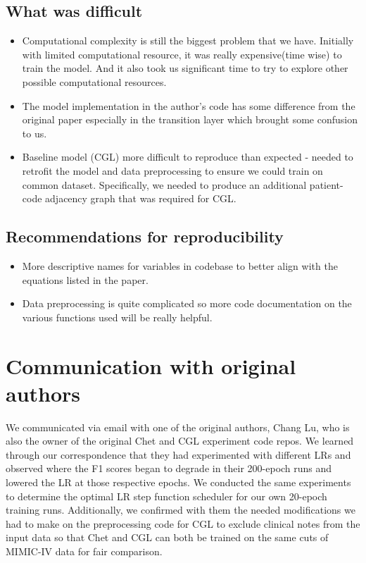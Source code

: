 \documentclass[11pt,a4paper,fleqn]{article}
\begin{document}
\subsection{What was difficult}
\begin{itemize}
    \item Computational complexity is still the biggest problem that we have. Initially with limited computational resource, it was really expensive(time wise) to train the model. And it also took us significant time to try to explore other possible computational resources.
    \item The model implementation in the author's code has some difference from the original paper especially in the transition layer which brought some confusion to us.
    \item Baseline model (CGL) more difficult to reproduce than expected - needed to retrofit the model and data preprocessing to ensure we could train on common dataset. Specifically, we needed to produce an additional patient-code adjacency graph that was required for CGL.
\end{itemize}

\subsection{Recommendations for reproducibility}
\begin{itemize}
    \item More descriptive names for variables in codebase to better align with the equations listed in the paper.
    \item Data preprocessing is quite complicated so more code documentation on the various functions used will be really helpful.
\end{itemize}

\section{Communication with original authors}
We communicated via email with one of the original authors, Chang Lu, who is
also the owner of the original Chet and CGL experiment code repos. We learned
through our correspondence that they had experimented with different LRs and
observed where the F1 scores began to degrade in their 200-epoch runs and
lowered the LR at those respective epochs. We conducted the same experiments to
determine the optimal LR step function scheduler for our own 20-epoch training
runs. Additionally, we confirmed with them the needed modifications we had to
make on the preprocessing code for CGL to exclude clinical notes from the input
data so that Chet and CGL can both be trained on the same cuts of MIMIC-IV data
for fair comparison.





\end{document}
